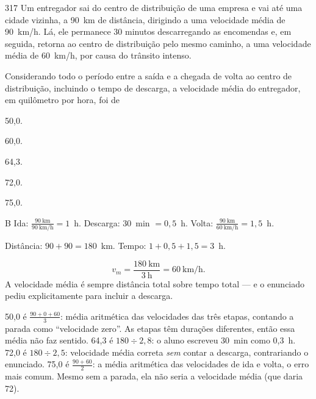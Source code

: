 \begin{questaoinedita}{3}{17}
Um entregador sai do centro de distribuição de uma empresa e vai até uma cidade
vizinha, a 90~km de distância, dirigindo a uma velocidade média de 90~km/h. Lá,
ele permanece 30 minutos descarregando as encomendas e, em seguida, retorna ao
centro de distribuição pelo mesmo caminho, a uma velocidade média de 60~km/h,
por causa do trânsito intenso.

Considerando todo o período entre a saída e a chegada de volta ao centro de
distribuição, incluindo o tempo de descarga, a velocidade média do entregador,
em quilômetro por hora, foi de
\begin{alternativas*}[5]
  \item 50,0.
  \item 60,0.
  \item 64,3.
  \item 72,0.
  \item 75,0.
\end{alternativas*}
\end{questaoinedita}
\begin{resolucao}{B}
 Ida: $\frac{90~\text{km}}{90~\text{km/h}} = 1$~h.
Descarga: 30~min $= 0{,}5$~h. Volta: $\frac{90~\text{km}}{60~\text{km/h}} = 1{,}5$~h.

 Distância: $90 + 90 = 180$~km. Tempo: $1 + 0{,}5 + 1{,}5 = 3$~h.

\[
v_m = \frac{180~\text{km}}{3~\text{h}} = 60~\text{km/h}.
\]
A velocidade média é sempre distância total sobre tempo total — e o enunciado pediu
explicitamente para incluir a descarga.
\begin{distratores}
 50,0 é $\frac{90 + 0 + 60}{3}$: média aritmética das velocidades das três etapas,
contando a parada como ``velocidade zero''. As etapas têm durações diferentes, então
essa média não faz sentido.
 64,3 é $180 \div 2{,}8$: o aluno escreveu 30~min como 0,3~h.
 72,0 é $180 \div 2{,}5$: velocidade média correta \emph{sem} contar a descarga,
contrariando o enunciado.
 75,0 é $\frac{90 + 60}{2}$: a média aritmética das velocidades de ida e volta,
o erro mais comum. Mesmo sem a parada, ela não seria a velocidade média (que daria 72).
\end{distratores}
\end{resolucao}

